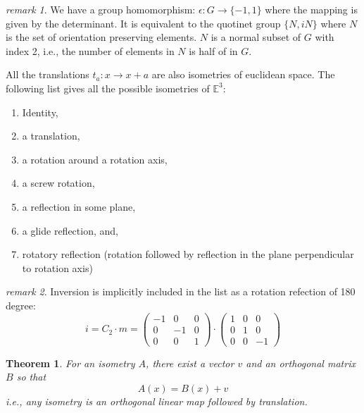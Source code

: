 \documentclass{amsart}
\newtheorem*{theorem}{Theorem}
\theoremstyle{remark}
\newtheorem*{remark}{remark}
\theoremstyle{remark}
\theoremstyle{definition}
\begin{document}
\begin{remark}
    We have a group homomorphism: $\epsilon\colon G \to \{-1, 1\}$ where the mapping is 
    given by the determinant. It is equivalent to the quotinet group $\{N, iN\}$ where 
    $N$ is the set of orientation preserving elements. $N$ is a normal subset of $G$ with 
    index 2, i.e., the number of elements in $N$ is half of in $G$. 
\end{remark}


\vspace{10pt}
All the translations $t_a\colon x \to x+a$ are also isometries of euclidean space. 
The following list gives all the possible isometries of $\mathbb{E}^3$: 
\begin{enumerate}
    \item Identity,
    \item a translation,
    \item a rotation around a rotation axis,
    \item a screw rotation,
    \item a reflection in some plane, 
    \item a glide reflection, and, 
    \item rotatory reflection (rotation followed by reflection in the plane perpendicular to rotation axis)
\end{enumerate}
\begin{remark}
Inversion is implicitly included in the list as a rotation refection of 180 degree:
\begin{equation*}
    i=C_2 \cdot m = \left(\begin{matrix}
        -1 & 0 & 0\\
        0  & -1 & 0\\
        0 & 0 & 1
    \end{matrix}\right) \cdot \left(\begin{matrix}
        1 & 0 & 0\\
        0  & 1 & 0\\
        0 & 0 & -1
    \end{matrix}\right)
\end{equation*}
\end{remark}

\vspace{10pt}

\begin{theorem}
    For an isometry $A$, there exist a vector $v$ and an orthogonal matrix $B$ so that 
    \begin{equation*}
        A(x) = B(x) + v 
    \end{equation*}
    i.e., any isometry is an orthogonal linear map followed by translation.
\end{theorem}
\end{document}

